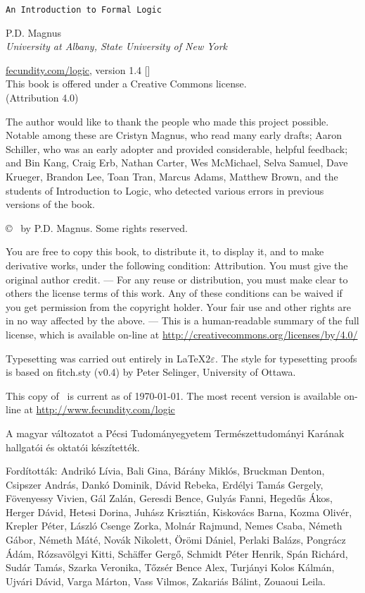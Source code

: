 \thispagestyle{empty}
{\Huge\forallx}

{\tt An Introduction to Formal Logic}

\vfill


{\sf P.D. Magnus}\\
\emph{University at Albany, State University of New York}


\vfill


{\sf
	\href{https://www.fecundity.com/logic/}{fecundity.com/logic}, version 1.4 [\bookversion]\\
	This book is offered under a Creative Commons license.\\
	(Attribution 4.0)
}



\newpage
\thispagestyle{empty}%
{\sf
The author would like to thank the people who made this project possible. Notable among these are Cristyn Magnus, who read many early drafts; Aaron Schiller, who was an early adopter and provided considerable, helpful feedback; {and} Bin Kang, Craig Erb, Nathan Carter, Wes McMichael, Selva Samuel,  Dave Krueger, Brandon Lee, Toan Tran, Marcus Adams, Matthew Brown, and the students of Introduction to Logic, who detected various errors in previous versions of the book.
}

\vfill
{
\copyright\  by P.D. Magnus. Some rights reserved.
}

{\footnotesize
You are free to copy this book, to distribute it, to display it, and to make derivative works, under the following condition: Attribution. You must give the original author credit. --- For any reuse or distribution, you must make clear to others the license terms of this work. Any of these conditions can be waived if you get permission from the copyright holder. Your fair use and other rights are in no way affected by the above. --- This is a human-readable summary of the full license, which is available on-line at \url{http://creativecommons.org/licenses/by/4.0/}
}

{
Typesetting was carried out entirely in \LaTeX$2\varepsilon$. The style for typesetting proofs is based on fitch.sty (v0.4) by Peter Selinger, University of Ottawa.

This copy of \forallx\ is current as of \today. The most recent version is available on-line at \url{http://www.fecundity.com/logic}
}

{
A magyar változatot a Pécsi Tudományegyetem Természettudományi Karának hallgatói és oktatói készítették.

Fordították: Andrikó Lívia, Bali Gina, Bárány Miklós, Bruckman Denton,
Csipszer András, Dankó Dominik, Dávid Rebeka, Erdélyi Tamás Gergely,
Fövenyessy Vivien, Gál Zalán, Geresdi Bence, Gulyás Fanni,
Hegedűs Ákos, Herger Dávid, Hetesi Dorina,
Juhász Krisztián, Kiskovács Barna, Kozma Olivér, Krepler Péter,
László Csenge Zorka, Molnár Rajmund,
Nemes Csaba, Németh Gábor, Németh Máté, Novák Nikolett,
Örömi Dániel, Perlaki Balázs, Pongrácz Ádám,
Rózsavölgyi Kitti,
Schäffer Gergő, Schmidt Péter Henrik, Spán Richárd, Sudár Tamás, Szarka Veronika,
Tőzsér Bence Alex, Turjányi Kolos Kálmán, Ujvári Dávid,
Varga Márton, Vass Vilmos, Zakariás Bálint, Zouaoui Leila.
}